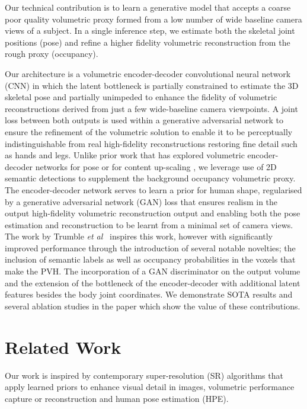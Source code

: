 \documentclass{bmvc2k}
\newcommand{\squeezeup}{\vspace{-2mm}}
\begin{document}
Our technical contribution is to learn a generative model that accepts a coarse poor quality volumetric proxy formed from a low number of wide baseline camera views of a subject. In a single inference step, we estimate both the skeletal joint positions (pose) and refine a higher fidelity volumetric reconstruction from the rough proxy (occupancy).

Our architecture is a volumetric encoder-decoder convolutional neural network (CNN) in which the latent bottleneck is partially constrained to estimate the 3D skeletal pose and partially unimpeded to enhance the fidelity of volumetric reconstructions derived from just a few wide-baseline camera viewpoints. A joint loss between both outputs is used within a generative adversarial network to ensure the refinement of the volumetric solution to enable it to be perceptually indistinguishable from real high-fidelity reconstructions restoring fine detail such as hands and legs. Unlike prior work that has explored volumetric encoder-decoder networks for pose \cite{trumble:eccv:2018} or for content up-scaling \cite{gilbert2018volumetric}, we leverage use of 2D semantic detections to supplement the background occupancy volumetric proxy. The encoder-decoder network serves to learn a prior for human shape, regularised by a generative adversarial network (GAN) loss that ensures realism in the output high-fidelity volumetric reconstruction output and enabling both the pose estimation and reconstruction to be learnt from a minimal set of camera views. The work by Trumble \emph{et al}~\cite{trumble:eccv:2018}  inspires this work, however with significantly improved performance through the introduction of several notable novelties; the inclusion of semantic labels as well as occupancy probabilities in the voxels that make the PVH.  The incorporation of a GAN discriminator on the output volume and the extension of the bottleneck of the encoder-decoder with additional latent features besides the body joint coordinates. We demonstrate SOTA results and several ablation studies in the paper which show the value of these contributions.






\squeezeup
\squeezeup
\section{Related Work}
Our work is inspired by contemporary super-resolution (SR) algorithms that apply learned priors to enhance visual detail in images, volumetric performance capture or reconstruction and human pose estimation (HPE).
\end{document}
